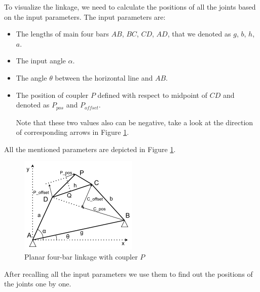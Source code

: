 \documentclass{article}
\begin{document}
To visualize the linkage, we need to calculate the positions of all the joints based on the input parameters. The input parameters are:
\begin{itemize}
 \item The lengths of main four bars $AB$, $BC$, $CD$, $AD$, that we denoted as $g$, $b$, $h$, $a$.
 \item The input angle $\alpha$.
 \item The angle $\theta$ between the horizontal line and $AB$.
 \item The position of coupler $P$ defined with respect to midpoint of $CD$ and denoted as $P_{pos}$ and $P_{offset}$. 
 
 Note that these two values also can be negative, take a look at the direction of corresponding arrows in Figure \ref{fig:four-bar_linakge_analysis}.
\end{itemize}

All the mentioned parameters are depicted in Figure \ref{fig:four-bar_linakge_analysis}.

\begin{figure}[h]
	\begin{center}
		\includegraphics[width=0.5\textwidth]{./figures/four-bar_linkage+coupler_analysis.pdf}
	\end{center}
	\caption{Planar four-bar linkage with coupler $P$}
	\label{fig:four-bar_linakge_analysis}
\end{figure}
 
 After recalling all the input parameters we use them to find out the positions of the joints one by one.
 
\end{document}
